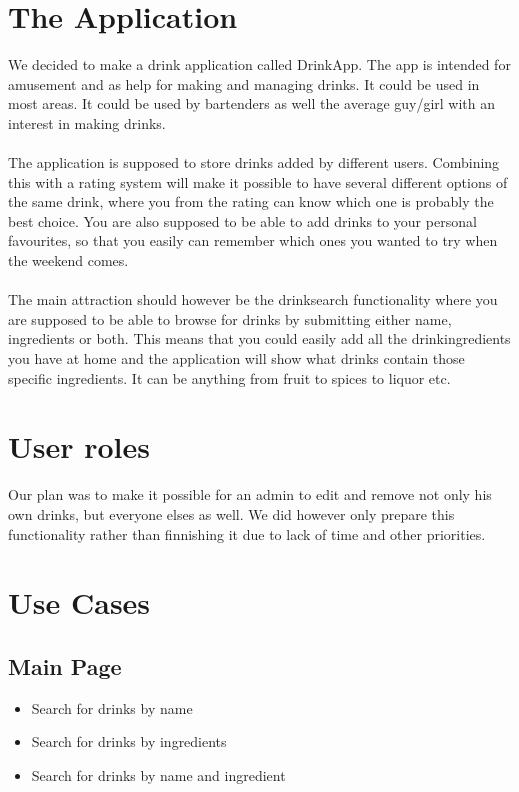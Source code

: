 \documentclass[a4paper]{article}
\begin{document}
\tableofcontents

\pagebreak

\section{The Application}
We decided to make a drink application called DrinkApp. The app is intended for amusement and as help for making and managing drinks. It could be used in most areas. It could be used by bartenders as well the average guy/girl with an interest in making drinks. \\
\\
The application is supposed to store drinks added by different users. Combining this with a rating system will make it possible to have several different options of the same drink, where you from the rating can know which one is probably the best choice. You are also supposed to be able to add drinks to your personal favourites, so that you easily can remember which ones you wanted to try when the weekend comes.\\
\\
The main attraction should however be the drinksearch functionality where you are supposed to be able to browse for drinks by submitting either name, ingredients or both. This means that you could easily add all the drinkingredients you have at home and the application will show what drinks contain those specific ingredients. It can be anything from fruit to spices to liquor etc.

\section{User roles}
Our plan was to make it possible for an admin to edit and remove not only his own drinks, but everyone elses as well. We did however only prepare this functionality rather than finnishing it due to lack of time and other priorities.

\section{Use Cases}

\subsection{Main Page}

\begin{itemize}
\item Search for drinks by name
\item Search for drinks by ingredients
\item Search for drinks by name and ingredient
\end{itemize}
\end{document}

